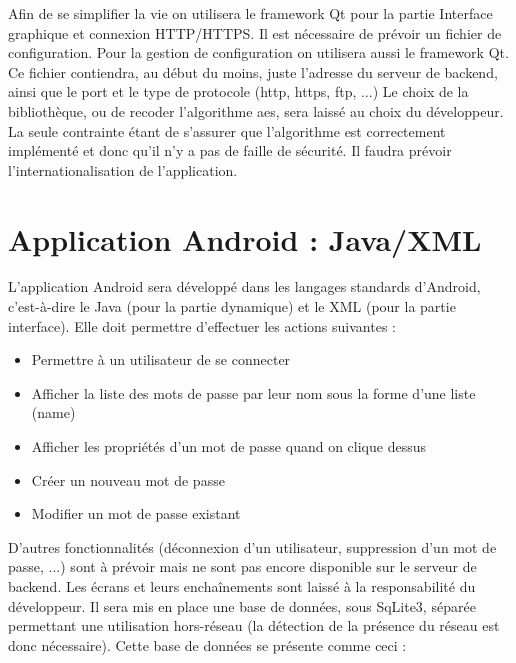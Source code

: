 \documentclass[12pt]{report}
\begin{document}
	Afin de se simplifier la vie on utilisera le framework Qt pour la partie Interface graphique et connexion HTTP/HTTPS.
	\newline
	Il est nécessaire de prévoir un fichier de configuration. Pour la gestion de configuration on utilisera aussi le framework Qt. Ce fichier contiendra, au début du moins, juste l'adresse du serveur de backend, ainsi que le port et le type de protocole (http, https, ftp, ...)
	\newline
	Le choix de la bibliothèque, ou de recoder l'algorithme \gls{aes}, sera laissé au choix du développeur. La seule contrainte étant de s'assurer que l'algorithme est correctement implémenté et donc qu'il n'y a pas de faille de sécurité.
	\newline
	Il faudra prévoir l'internationalisation de l'application.
	\chapter{Application Android : Java/XML}
	L'application Android sera développé dans les langages standards d'Android, c'est-à-dire le Java (pour la partie dynamique) et le XML (pour la partie interface). Elle doit permettre d'effectuer les actions suivantes :
	\begin{itemize}
		\item Permettre à un utilisateur de se connecter
		\item Afficher la liste des mots de passe par leur nom sous la forme d'une liste (name)
		\item Afficher les propriétés d'un mot de passe quand on clique dessus
		\item Créer un nouveau mot de passe
		\item Modifier un mot de passe existant
	\end{itemize}
	D'autres fonctionnalités (déconnexion d'un utilisateur, suppression d'un mot de passe, ...) sont à prévoir mais ne sont pas encore disponible sur le serveur de backend.
	\newline
	Les écrans et leurs enchaînements sont laissé à la responsabilité du développeur.
	\newline
	Il sera mis en place une base de données, sous SqLite3, séparée permettant une utilisation hors-réseau (la détection de la présence du réseau est donc nécessaire).
	\newline
	Cette base de données se présente comme ceci :
\end{document}
